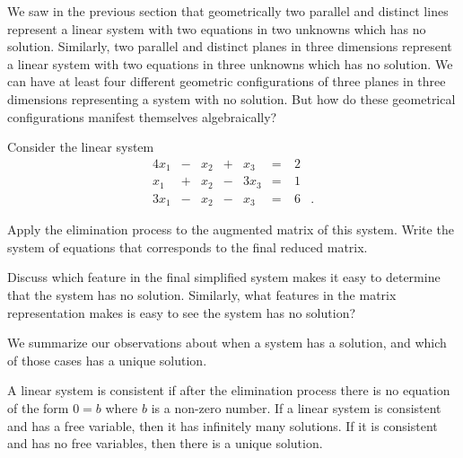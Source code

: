 \label{sec:sys_no_sols}

We saw in the previous section that geometrically two parallel and distinct lines represent a linear system with two equations in two unknowns which has no solution. Similarly, two parallel and distinct planes in three dimensions represent a linear system with two equations in three unknowns which has no solution. We can have at least four different geometric configurations of three planes in three dimensions representing a system with no solution. But how do these geometrical configurations manifest themselves algebraically? 

\begin{activity} Consider the linear system
\begin{alignat*}{4}
x_1 		&{}-{}	&x_2 	&{}+{}	&{}x_3	&{}={} & \ 2 &{} \\
x_1		&{}+{}	&x_2	&{}-{}	&{3}x_3	&{}={} & \ 1 &{} \\
{3}x_1	&{}-{}	&x_2	&{}-{}	&{}x_3	&{}={}	& \ 6 &{.}
\end{alignat*}

\ba 
\item Apply the elimination process to the augmented matrix of this system. Write the system of equations that corresponds to the final reduced matrix. 



\item Discuss which feature in the final simplified system makes it easy to determine that the system has no solution. Similarly, what features in the matrix representation makes is easy to see the system has no solution?



\ea

\end{activity}

We summarize our observations about when a system has a solution, and which of those cases has a unique solution.

\begin{theorem}
A linear system is consistent if after the elimination process there is no equation of the form $0=b$ where $b$ is a non-zero number. If a linear system is consistent and has a free variable, then it has infinitely many solutions. If it is consistent and has no free variables, then there is a unique solution.
\end{theorem}



\label{sec:mtx_sys_exam}

